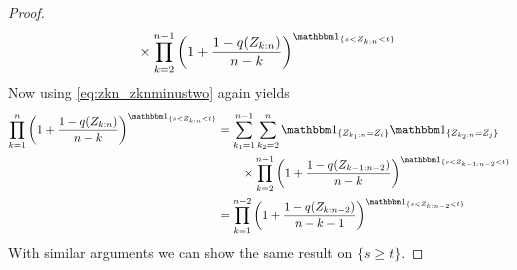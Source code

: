 \begin{lemma}
\begin{proof}
\begin{align*}
		&\qquad \times \prod_{k=2}^{n-1}\left(1+\frac{1-q(Z_{k:n})}{n-k}\right)^{\I{s<Z_{k:n}<t}}
		\end{align*}
		Now using \eqref{eq:zkn_zknminustwo} again yields
		\begin{align*}
		\prod_{k=1}^{n}\left(1+\frac{1-q(Z_{k:n})}{n-k}\right)^{\I{s<Z_{k:n}<t}}
		&= \sum_{k_1=1}^{n-1}\sum_{k_2=2}^{n} \I{Z_{k_1:n}=Z_i}\I{Z_{k_2:n}=Z_j}\\
		&\qquad \times \prod_{k=2}^{n-1}\left(1+\frac{1-q(Z_{k-1:n-2})}{n-k}\right)^{\I{s<Z_{k-1:n-2}<t}}\\
		&= \prod_{k=1}^{n-2}\left(1+\frac{1-q(Z_{k:n-2})}{n-k-1}\right)^{\I{s<Z_{k:n-2}<t}}\\
		\end{align*}
		With similar arguments we can show the same result on $\{s\geq t\}$.
	\end{proof}
\end{lemma}
%
